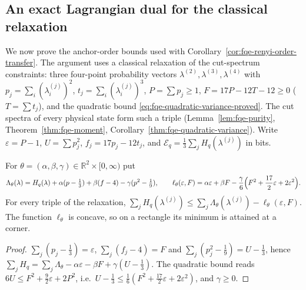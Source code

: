 \subsection{An exact Lagrangian dual for the classical relaxation}
\label{sec:fqe-renyi-covering}

We now prove the anchor-order bounds used with Corollary~\ref{cor:fqe-renyi-order-transfer}.
The argument uses a classical relaxation of the cut-spectrum constraints: three four-point probability vectors
$\lambda^{(2)},\lambda^{(3)},\lambda^{(4)}$ with
$p_j=\sum_i(\lambda^{(j)}_i)^2$, $t_j=\sum_i(\lambda^{(j)}_i)^3$, $P=\sum p_j\ge1$,
$F=17P-12T-12\ge0$ ($T=\sum t_j$), and the quadratic bound \eqref{eq:fqe-quadratic-variance-proved}.
The cut spectra of every physical state form such a triple (Lemma~\ref{lem:fqe-purity}, Theorem~\ref{thm:fqe-moment},
Corollary~\ref{thm:fqe-quadratic-variance}). Write $\varepsilon=P-1$, $U=\sum p_j^2$,
$f_j=17p_j-12t_j$, and $\mathcal E_q=\frac13\sum_jH_q(\lambda^{(j)})$ in bits.

\begin{lemma}\label{lem:fqe-dual}
For $\theta=(\alpha,\beta,\gamma)\in\mathbb R^2\times[0,\infty)$ put
\[
\Lambda_\theta(\lambda)=H_q(\lambda)+\alpha(p-\tfrac13)+\beta(f-4)-\gamma(p^2-\tfrac19),
\qquad
\ell_\theta(\varepsilon,F)=\alpha\varepsilon+\beta F-\frac\gamma6\Bigl(F^2+\frac{17}2\varepsilon+2\varepsilon^2\Bigr).
\]
For every triple of the relaxation, $\sum_jH_q(\lambda^{(j)})\le\sum_j\Lambda_\theta(\lambda^{(j)})-\ell_\theta(\varepsilon,F)$.
The function $\ell_\theta$ is concave, so on a rectangle its minimum is attained at a corner.
\end{lemma}
\begin{proof}
$\sum_j(p_j-\frac13)=\varepsilon$, $\sum_j(f_j-4)=F$ and $\sum_j(p_j^2-\frac19)=U-\frac13$, hence
$\sum_jH_q=\sum_j\Lambda_\theta-\alpha\varepsilon-\beta F+\gamma(U-\frac13)$. The quadratic bound reads
$6U\le F^2+\frac92\varepsilon+2P^2$, i.e.\ $U-\frac13\le\frac16(F^2+\frac{17}2\varepsilon+2\varepsilon^2)$, and $\gamma\ge0$.
\end{proof}

